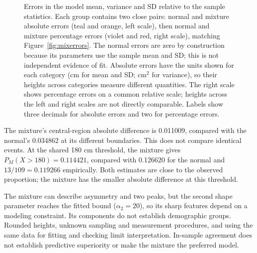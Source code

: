 \documentclass[10pt,a4paper]{article}
\begin{document}
\begin{figure}[htbp]
\caption{Errors in the model mean, variance and SD relative to the sample
statistics. Each group contains two close pairs: normal and mixture absolute
errors (teal and orange, left scale), then normal and mixture percentage
errors (violet and red, right scale), matching Figure~\ref{fig:mixerrors}.
The normal errors are zero by construction because its parameters use the
sample mean and SD; this is not independent evidence of fit.
Absolute errors have the units shown for each category (cm for mean and SD;
$\mathrm{cm}^2$ for variance), so their heights across categories measure
different quantities. The right scale shows percentage errors on a common
relative scale; heights across the left and right scales are not directly
comparable. Labels show three decimals for absolute errors and two for
percentage errors.}
\label{fig:mixmomenterrors}
\end{figure}


The mixture's central-region absolute difference is 0.011009, compared
with the normal's 0.034862 at its different boundaries. This does not
compare identical events. At the shared 180 cm threshold, the mixture
gives $P_M(X>180)=0.114421$, compared with 0.126620 for
the normal and $13/109=0.119266$ empirically. Both estimates are close
to the observed proportion; the mixture has the smaller absolute difference
at this threshold.

The mixture can describe asymmetry and two peaks, but the second shape
parameter reaches the fitted bound ($\alpha_2=20$), so its sharp features
depend on a modeling constraint. Its components do not establish demographic
groups. Rounded heights, unknown sampling and measurement procedures,
and using the same data for fitting and checking limit interpretation.
In-sample agreement does not establish predictive superiority or make
the mixture the preferred model.
\end{document}
